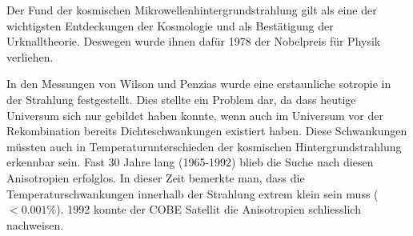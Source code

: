 Der Fund der kosmischen Mikrowellenhintergrundstrahlung gilt als eine der wichtigsten Entdeckungen der Kosmologie und als 
Bestätigung der Urknalltheorie.
Deswegen wurde ihnen dafür 1978 der Nobelpreis für Physik verliehen.
\cite{cmb_dicke}

In den Messungen von Wilson und Penzias wurde eine erstaunliche sotropie in der 
Strahlung festgestellt.
Dies stellte ein Problem dar, da dass heutige Universum sich nur gebildet haben 
konnte, wenn auch im Universum vor der Rekombination bereits Dichteschwankungen 
existiert haben.
Diese Schwankungen müssten auch in Temperaturunterschieden der kosmischen 
Hintergrundstrahlung erkennbar sein.
Fast 30 Jahre lang (1965-1992) blieb die Suche nach diesen Anisotropien 
erfolglos.
In dieser Zeit bemerkte man, dass die Temperaturschwankungen innerhalb der 
Strahlung extrem klein sein muss ($< 0.001\%$).
1992 konnte der \ac{COBE} Satellit die Anisotropien schliesslich nachweisen.
\cite{m_schoenitzer}

